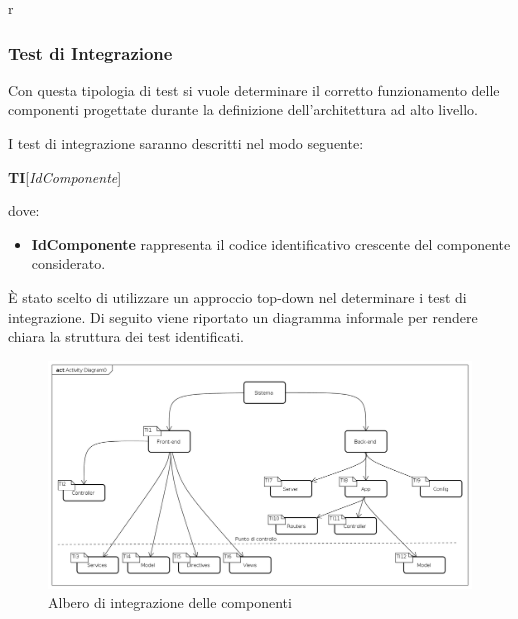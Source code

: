r\subsubsection{Test di Integrazione}
Con questa tipologia di test si vuole determinare il corretto funzionamento delle componenti progettate durante la definizione dell'architettura ad alto livello.

I test di integrazione saranno descritti nel modo seguente:
\begin{center}
\textbf{TI}[\textit{IdComponente}]
\end{center}
dove:
\begin{itemize}
\item
\textbf{IdComponente} rappresenta il codice identificativo crescente del componente considerato.
\end{itemize}
È stato scelto di utilizzare un approccio top-down nel determinare i test di integrazione. Di seguito viene riportato un diagramma informale per rendere chiara la struttura dei test identificati.
\begin{figure}[ht]
	\centering
	\includegraphics[scale=0.45]{AlberoDiIntegrazione.png}
	\caption{Albero di integrazione delle componenti}
\end{figure}
\FloatBarrier

